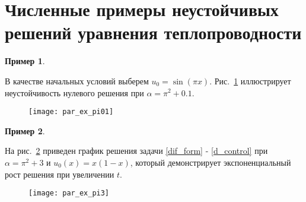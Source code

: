 \section{Численные примеры неустойчивых решений уравнения теплопроводности}

\newtheorem{exmp}{Пример}

\begin{exmp}
\end{exmp}

В качестве начальных условий выберем $u_0 = \sin(\pi x)$. Рис.~\ref{fig:fig01} 
иллюстрирует неустойчивость нулевого решения при $\alpha = \pi^2 + 0.1$.


\begin{figure}
  \centering
  \texttt{[image: par\_ex\_pi01]}
  \caption{}
  \label{fig:fig01}
\end{figure}

\begin{exmp}
\end{exmp}

На рис.~\ref{fig:fig02} приведен график решения задачи \eqref{dif_form} - \eqref{d_control}
при $\alpha = \pi^2 + 3$ и $u_0(x) = x(1 - x)$, который демонстрирует 
экспоненциальный рост решения при увеличении $t$.


\begin{figure}
  \centering
  \texttt{[image: par\_ex\_pi3]}
  \caption{}
  \label{fig:fig02}
\end{figure}



